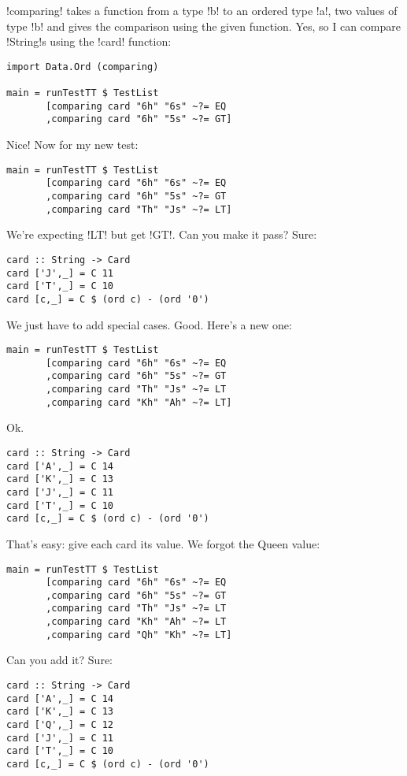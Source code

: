 \il!comparing! takes a function from a type \il!b! to an ordered type \il!a!, two values of type \il!b! and gives the comparison using the given function.
\lhN Yes, so I can compare \il!String!s using the \il!card! function:
\begin{lstlisting}[frame=single]
import Data.Ord (comparing)

main = runTestTT $ TestList 
       [comparing card "6h" "6s" ~?= EQ
       ,comparing card "6h" "5s" ~?= GT]
\end{lstlisting} %
\hspace*{\fill}
\lhA \success Nice!
\lhN Now for my new test:
\begin{lstlisting}[frame=single]
main = runTestTT $ TestList 
       [comparing card "6h" "6s" ~?= EQ
       ,comparing card "6h" "5s" ~?= GT
       ,comparing card "Th" "Js" ~?= LT]
\end{lstlisting} %
\failure We're expecting \il!LT! but get \il!GT!. Can you make it pass?
\lhA
\failure Sure:
\begin{lstlisting}[frame=single]
card :: String -> Card
card ['J',_] = C 11
card ['T',_] = C 10
card [c,_] = C $ (ord c) - (ord '0')
\end{lstlisting} %
\success We just have to add special cases.
\lhN Good. Here's a new one:
\begin{lstlisting}[frame=single]
main = runTestTT $ TestList 
       [comparing card "6h" "6s" ~?= EQ
       ,comparing card "6h" "5s" ~?= GT
       ,comparing card "Th" "Js" ~?= LT
       ,comparing card "Kh" "Ah" ~?= LT]
\end{lstlisting} %
\hspace*{\fill} 
\lhA \failure Ok. 
\begin{lstlisting}[frame=single]
card :: String -> Card
card ['A',_] = C 14
card ['K',_] = C 13
card ['J',_] = C 11
card ['T',_] = C 10
card [c,_] = C $ (ord c) - (ord '0')
\end{lstlisting} %
\success That's easy: give each card its value.
\lhN We forgot the Queen value:
\begin{lstlisting}[frame=single]
main = runTestTT $ TestList 
       [comparing card "6h" "6s" ~?= EQ
       ,comparing card "6h" "5s" ~?= GT
       ,comparing card "Th" "Js" ~?= LT
       ,comparing card "Kh" "Ah" ~?= LT
       ,comparing card "Qh" "Kh" ~?= LT]
\end{lstlisting} %
Can you add it?
\lhA \failure Sure:
\begin{lstlisting}[frame=single]
card :: String -> Card
card ['A',_] = C 14
card ['K',_] = C 13
card ['Q',_] = C 12
card ['J',_] = C 11
card ['T',_] = C 10
card [c,_] = C $ (ord c) - (ord '0')
\end{lstlisting} %
